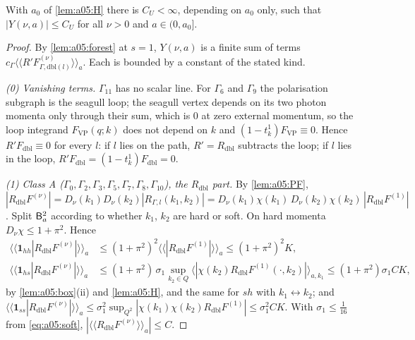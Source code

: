 \begin{proposition}\label{prop:a05:U}
With $a_0$ of \cref{lem:a05:H} there is $C_U<\infty$, depending on $a_0$ only, such that $|Y(\nu,a)|\le C_U$ for all $\nu>0$ and $a\in(0,a_0]$.
\end{proposition}
\begin{proof}
By \cref{lem:a05:forest} at $s=1$, $Y(\nu,a)$ is a finite sum of terms $c_\Gamma\langle\langle R'F^{(\nu)}_{\Gamma,\mathrm{dbl}(l)}\rangle\rangle_a$. Each is bounded by a constant of the stated kind.

\emph{(0) Vanishing terms.} $\Gamma_{11}$ has no scalar line. For $\Gamma_6$ and $\Gamma_9$ the polarisation subgraph is the seagull loop; the seagull vertex depends on its two photon momenta only through their sum, which is $0$ at zero external momentum, so the loop integrand $F_{\mathrm{VP}}(q;k)$ does not depend on $k$ and $(1-t^1_k)F_{\mathrm{VP}}\equiv0$. Hence $R'F_{\mathrm{dbl}}\equiv0$ for every $l$: if $l$ lies on the path, $R'=R_{\mathrm{dbl}}$ subtracts the loop; if $l$ lies in the loop, $R'F_{\mathrm{dbl}}=(1-t^1_k)F_{\mathrm{dbl}}=0$.

\emph{(1) Class A ($\Gamma_0,\Gamma_2,\Gamma_3,\Gamma_5,\Gamma_7,\Gamma_8,\Gamma_{10}$), the $R_{\mathrm{dbl}}$ part.} By \cref{lem:a05:PF}, $|R_{\mathrm{dbl}}F^{(\nu)}|=D_\nu(k_1)D_\nu(k_2)|R_{\Gamma,l}(k_1,k_2)|=D_\nu(k_1)\chi(k_1)\,D_\nu(k_2)\chi(k_2)\,|R_{\mathrm{dbl}}F^{(1)}|$. Split $\mathsf B_a^2$ according to whether $k_1$, $k_2$ are hard or soft. On hard momenta $D_\nu\chi\le1+\pi^2$. Hence
\begin{align*}
\langle\langle\mathbf 1_{hh}|R_{\mathrm{dbl}}F^{(\nu)}|\rangle\rangle_a&\le(1+\pi^2)^2\langle\langle|R_{\mathrm{dbl}}F^{(1)}|\rangle\rangle_a\le(1+\pi^2)^2K,\\
\langle\langle\mathbf 1_{hs}|R_{\mathrm{dbl}}F^{(\nu)}|\rangle\rangle_a&\le(1+\pi^2)\,\sigma_1\sup_{k_2\in Q}\big\langle|\chi(k_2)R_{\mathrm{dbl}}F^{(1)}(\cdot,k_2)|\big\rangle_{a,k_1}\le(1+\pi^2)\sigma_1CK,
\end{align*}
by \cref{lem:a05:box}(ii) and \cref{lem:a05:H}, and the same for $sh$ with $k_1\leftrightarrow k_2$; and $\langle\langle\mathbf 1_{ss}|R_{\mathrm{dbl}}F^{(\nu)}|\rangle\rangle_a\le\sigma_1^2\sup_{Q^2}|\chi(k_1)\chi(k_2)R_{\mathrm{dbl}}F^{(1)}|\le\sigma_1^2CK$. With $\sigma_1\le\frac1{16}$ from \eqref{eq:a05:soft}, $|\langle\langle R_{\mathrm{dbl}}F^{(\nu)}\rangle\rangle_a|\le C$.


\end{proof}
